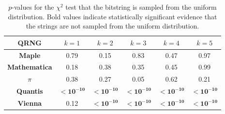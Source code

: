\documentclass{mscs}
\begin{document}
\begin{table}
\begin{center}
\caption{$p$-values for the $\chi^2$ test that the bitstring is sampled from the uniform distribution. Bold values indicate statistically significant evidence that the strings are not sampled from the uniform distribution.}
\begin{tabular}{cccccc}
\hline\hline
QRNG &  $k=1$ & $k=2$ & $k=3$ & $k=4$ & $k=5$\\
\hline
{\bf Maple} & 0.79 & 0.15 & 0.83 & 0.47 & 0.97\\
{\bf Mathematica} & 0.18 & 0.38 & 0.35 & 0.45 & 0.99\\
{\bf $\pi$} & 0.38 & 0.27 & 0.05 & 0.62 & 0.21\\
{\bf Quantis} & $\mathbf{< 10^{-10}}$ & $\mathbf{< 10^{-10}}$ & $\mathbf{< 10^{-10}}$ & $\mathbf{< 10^{-10}}$ & $\mathbf{< 10^{-10}}$\\
{\bf Vienna} & 0.12 & $\mathbf{< 10^{-10}}$ & $\mathbf{< 10^{-10}}$ & $\mathbf{< 10^{-10}}$ & $\mathbf{< 10^{-10}}$\\
\hline\hline
\end{tabular}
\end{center}
\label{pvalues}
\end{table}



\end{document}
